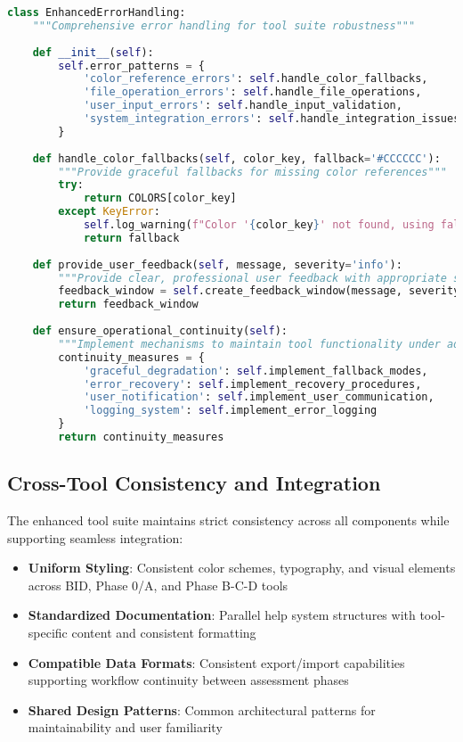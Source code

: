 \documentclass[binding=0.6cm]{sapthesis}
\begin{document}
\begin{lstlisting}[language=Python, caption=Enhanced Error Handling and Robustness]
class EnhancedErrorHandling:
    """Comprehensive error handling for tool suite robustness"""
    
    def __init__(self):
        self.error_patterns = {
            'color_reference_errors': self.handle_color_fallbacks,
            'file_operation_errors': self.handle_file_operations,
            'user_input_errors': self.handle_input_validation,
            'system_integration_errors': self.handle_integration_issues
        }
    
    def handle_color_fallbacks(self, color_key, fallback='#CCCCCC'):
        """Provide graceful fallbacks for missing color references"""
        try:
            return COLORS[color_key]
        except KeyError:
            self.log_warning(f"Color '{color_key}' not found, using fallback")
            return fallback
    
    def provide_user_feedback(self, message, severity='info'):
        """Provide clear, professional user feedback with appropriate styling"""
        feedback_window = self.create_feedback_window(message, severity)
        return feedback_window
    
    def ensure_operational_continuity(self):
        """Implement mechanisms to maintain tool functionality under adverse conditions"""
        continuity_measures = {
            'graceful_degradation': self.implement_fallback_modes,
            'error_recovery': self.implement_recovery_procedures,
            'user_notification': self.implement_user_communication,
            'logging_system': self.implement_error_logging
        }
        return continuity_measures
\end{lstlisting}

\subsection{Cross-Tool Consistency and Integration}

The enhanced tool suite maintains strict consistency across all components while supporting seamless integration:

\begin{itemize}
    \item \textbf{Uniform Styling}: Consistent color schemes, typography, and visual elements across BID, Phase 0/A, and Phase B-C-D tools
    \item \textbf{Standardized Documentation}: Parallel help system structures with tool-specific content and consistent formatting
    \item \textbf{Compatible Data Formats}: Consistent export/import capabilities supporting workflow continuity between assessment phases
    \item \textbf{Shared Design Patterns}: Common architectural patterns for maintainability and user familiarity
\end{itemize}
\end{document}
